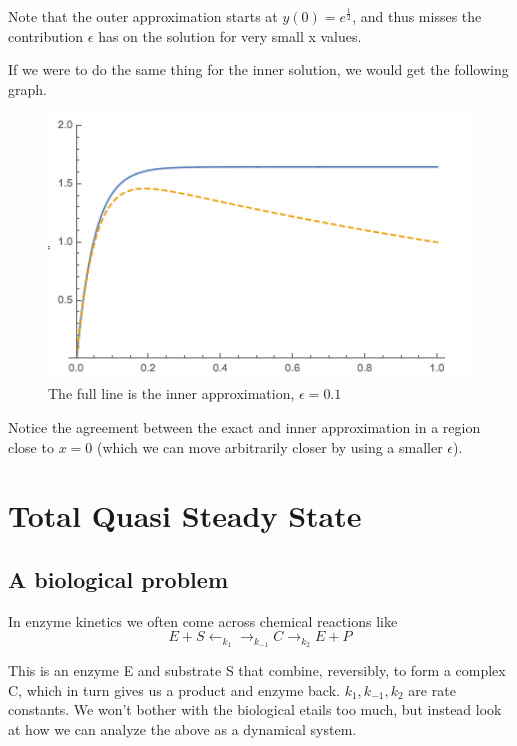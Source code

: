\documentclass[12pt]{article}
\begin{document}
Note that the outer approximation starts at $y(0)=e^{\frac{1}{2}}$,
and thus misses the contribution $\epsilon$ has on the solution for
very small x values.

If we were to do the same thing for the inner solution, we would get
the following graph.
\begin{figure}[ht!]
\centering
\includegraphics[width=120mm]
{tmp_ode-inner.png}
\caption{The full line is the inner approximation, $\epsilon=0.1$}
\label{overflow}
\end{figure}

Notice the agreement between the exact and inner approximation in a
region close to $x=0$ (which we can move arbitrarily closer by using a
smaller $\epsilon$).

\section{Total Quasi Steady State}

\subsection{A biological problem}

In enzyme kinetics we often come across chemical reactions like
\begin{equation}
E + S \leftarrow_{k_1} \rightarrow_{k_{-1}} C \rightarrow_{k_2} E + P
\end{equation}

This is an enzyme E and substrate S that combine, reversibly, to form a complex
C, which in turn gives us a product and enzyme back. $k_1, k_{-1}, k_2$ are rate
constants. We won't bother with the biological etails too much, but instead look
at how we can analyze the above as a dynamical system.
\end{document}
